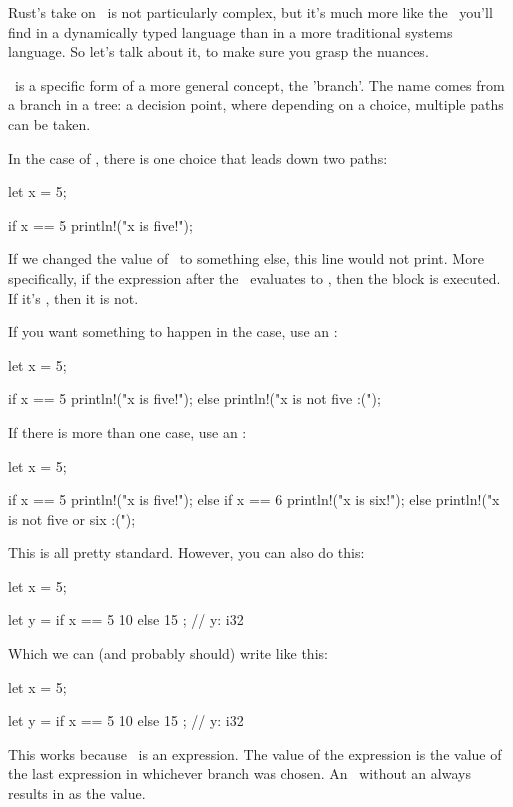 Rust's take on \keyif\ is not particularly complex, but it's much more like the \keyif\ you'll find in a dynamically typed language 
than in a more traditional systems language. So let's talk about it, to make sure you grasp the nuances.

\blank

\keyif\ is a specific form of a more general concept, the 'branch'. The name comes from a branch in a tree: a decision point, where
depending on a choice, multiple paths can be taken.

\blank

In the case of \keyif, there is one choice that leads down two paths:

\begin{rustc}
let x = 5;

if x == 5 {
    println!("x is five!");
}
\end{rustc}

If we changed the value of \x\ to something else, this line would not print. More specifically, if the expression after the 
\keyif\ evaluates to , then the block is executed. If it's , then it is not.

\blank

If you want something to happen in the  case, use an :

\begin{rustc}
let x = 5;

if x == 5 {
    println!("x is five!");
} else {
    println!("x is not five :(");
}
\end{rustc}

If there is more than one case, use an :

\begin{rustc}
let x = 5;

if x == 5 {
    println!("x is five!");
} else if x == 6 {
    println!("x is six!");
} else {
    println!("x is not five or six :(");
}
\end{rustc}

This is all pretty standard. However, you can also do this:

\begin{rustc}
let x = 5;

let y = if x == 5 {
    10
} else {
    15
}; // y: i32
\end{rustc}

Which we can (and probably should) write like this:

\begin{rustc}
let x = 5;

let y = if x == 5 { 10 } else { 15 }; // y: i32
\end{rustc}

This works because \keyif\ is an expression. The value of the expression is the value of the last expression in whichever branch 
was chosen. An \keyif\ without an  always results in \code{()} as the value.

